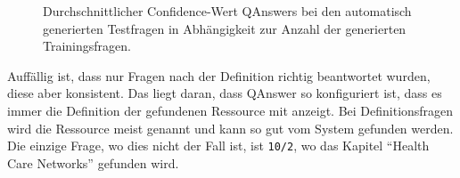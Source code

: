 \begin{figure}%
  \begin{center}
    \caption{Durchschnittlicher Confidence-Wert QAnswers bei den automatisch generierten Testfragen in Abhängigkeit zur Anzahl der generierten Trainingsfragen.}\label{plot:genconfidence}
  \end{center}
\end{figure}


Auffällig ist, dass nur Fragen nach der Definition richtig beantwortet wurden, diese aber konsistent.
Das liegt daran, dass QAnswer so konfiguriert ist, dass es immer die Definition der gefundenen Ressource mit anzeigt.
Bei Definitionsfragen wird die Ressource meist genannt und kann so gut vom System gefunden werden.
Die einzige Frage, wo dies nicht der Fall ist, ist \texttt{10/2}, wo das Kapitel \enquote{Health Care Networks} gefunden wird.

